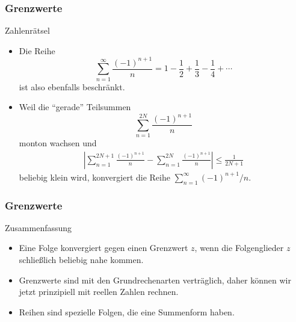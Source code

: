 \documentclass{beamer}
\newcommand{\abs}[1]{\left|#1\right|}
\renewcommand{\ae}{\"a}
\renewcommand{\oe}{\"o}
\newcommand{\mytitle}{Grenzwerte}
\begin{document}
\begin{frame}\frametitle{\mytitle}
	\begin{block}{Zahlenr\ae tsel}
		\begin{itemize}
			\item Die Reihe 
				$$\sum_{n=1}^\infty\frac{(-1)^{n+1}}n=1-\frac{1}{2}+\frac{1}{3}-\frac{1}{4}+\cdots$$
				ist also ebenfalls beschr\ae nkt.
			\item Weil die ``gerade'' Teilsummen
				$$\sum_{n=1}^{2N}\frac{(-1)^{n+1}}n$$
				monton wachsen und
				\begin{align*}
				\abs{\sum_{n=1}^{2N+1}\frac{(-1)^{n+1}}n-\sum_{n=1}^{2N}\frac{(-1)^{n+1}}n}\leq\frac{1}{2N+1}
				\end{align*}
				beliebig klein wird, konvergiert die Reihe $\sum_{n=1}^\infty(-1)^{n+1}/n$.
		\end{itemize}
	\end{block}
\end{frame}

\begin{frame}\frametitle{\mytitle}
	\begin{block}{Zusammenfassung}
		\begin{itemize}
			\item Eine Folge konvergiert gegen einen Grenzwert $z$, wenn die Folgenglieder $z$ schlie\ss lich beliebig nahe kommen.
			\item Grenzwerte sind mit den Grundrechenarten vertr\ae glich, daher k\oe nnen wir jetzt prinzipiell mit reellen Zahlen rechnen.
			\item Reihen sind spezielle Folgen, die eine Summenform haben.
		\end{itemize}
	\end{block}
\end{frame}
\end{document}
